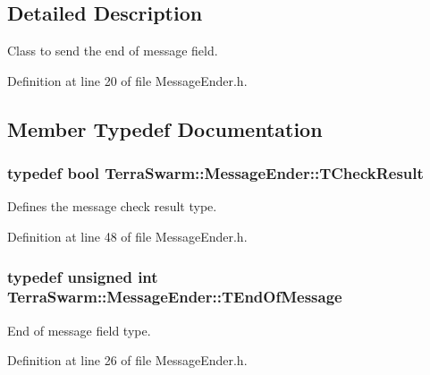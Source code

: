 \subsection{Detailed Description}
Class to send the end of message field. 

Definition at line 20 of file Message\-Ender.\-h.



\subsection{Member Typedef Documentation}
\hypertarget{class_terra_swarm_1_1_message_ender_a4f3f1bf696190619eb5580c3007ac83a}{
\subsubsection[{T\-Check\-Result}]{\setlength{\rightskip}{0pt plus 5cm}typedef bool {\bf Terra\-Swarm\-::\-Message\-Ender\-::\-T\-Check\-Result}}}\label{class_terra_swarm_1_1_message_ender_a4f3f1bf696190619eb5580c3007ac83a}


Defines the message check result type. 



Definition at line 48 of file Message\-Ender.\-h.

\hypertarget{class_terra_swarm_1_1_message_ender_a34ecb0835fc9e09799dd1a30fcf5ff65}{
\subsubsection[{T\-End\-Of\-Message}]{\setlength{\rightskip}{0pt plus 5cm}typedef unsigned int {\bf Terra\-Swarm\-::\-Message\-Ender\-::\-T\-End\-Of\-Message}\hspace{0.3cm}{\ttfamily [private]}}}\label{class_terra_swarm_1_1_message_ender_a34ecb0835fc9e09799dd1a30fcf5ff65}


End of message field type. 



Definition at line 26 of file Message\-Ender.\-h.

